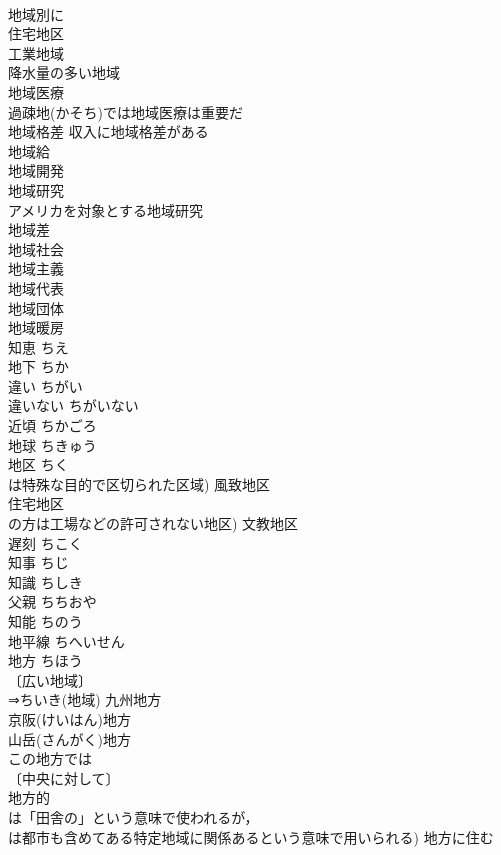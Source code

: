 \documentclass[8pt]{extreport}
\begin{document}
\begin{CJK}{UTF8}{min}
\\	地域別に 
\\	住宅地区 
\\	工業地域 
\\	降水量の多い地域 
\\	地域医療 
\\	過疎地(かそち)では地域医療は重要だ 
\\	地域格差 収入に地域格差がある 
\\	地域給 
\\	地域開発 
\\	地域研究 
\\	アメリカを対象とする地域研究 
\\	地域差 
\\	地域社会 
\\	地域主義 
\\	地域代表 
\\	地域団体 
\\	地域暖房 
\\	知恵	ちえ	
\\	地下	ちか	
\\	違い	ちがい	
\\	違いない	ちがいない	
\\	近頃	ちかごろ	
\\	地球	ちきゅう	
\\	地区	ちく	
\\	は特殊な目的で区切られた区域) 風致地区 
\\	住宅地区 
\\	の方は工場などの許可されない地区) 文教地区 
\\	遅刻	ちこく	
\\	知事	ちじ	
\\	知識	ちしき	
\\	父親	ちちおや	
\\	知能	ちのう	
\\	地平線	ちへいせん	
\\	地方	ちほう	
\\	〔広い地域〕
\\	⇒ちいき(地域) 九州地方 
\\	京阪(けいはん)地方 
\\	山岳(さんがく)地方 
\\	この地方では 
\\	〔中央に対して〕
\\	地方的 
\\	は「田舎の」という意味で使われるが，
\\	は都市も含めてある特定地域に関係あるという意味で用いられる) 地方に住む 

\end{CJK}
\end{document}
